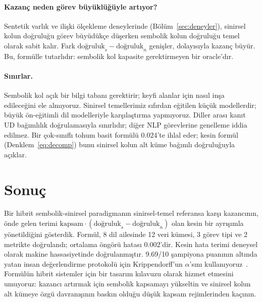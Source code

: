 \documentclass[11pt,a4paper]{article}
\begin{document}
\paragraph{Kazanç neden görev büyüklüğüyle artıyor?}
Sentetik varlık ve ilişki ölçekleme deneylerinde
(Bölüm~\ref{sec:deneyler}), sinirsel kolun doğruluğu görev büyüdükçe
düşerken sembolik kolun doğruluğu temel olarak sabit kalır. Fark
$\text{doğruluk}_s - \text{doğruluk}_n$ genişler, dolayısıyla kazanç
büyür. Bu, formülle tutarlıdır: sembolik kol kapasite gerektirmeyen
bir oracle'dır.

\paragraph{Sınırlar.}
Sembolik kol açık bir bilgi tabanı gerektirir; keyfi alanlar için nasıl
inşa edileceğini ele almıyoruz. Sinirsel temellerimiz sıfırdan
eğitilen küçük modellerdir; büyük ön-eğitimli dil modelleriyle
karşılaştırma yapmıyoruz. Diller arası kanıt UD bağımlılık
doğrulamasıyla sınırlıdır; diğer NLP görevlerine genelleme iddia
edilmez. Bir çok-sınıflı tohum basit formülü $0.024$'te ihlal eder;
kesin formül (Denklem~\ref{eq:decomp}) bunu sinirsel kolun alt küme
bağımlı doğruluğuyla açıklar.

\section{Sonuç}
\label{sec:sonuc}
Bir hibrit sembolik-sinirsel paradigmanın sinirsel-temel referansa
karşı kazancının, önde gelen terimi
$\text{kapsam} \cdot (\text{doğruluk}_s - \text{doğruluk}_n)$ olan
kesin bir ayrışımla yönetildiğini gösterdik. Formül, 8 dil ailesinde 12
veri kümesi, 3 görev tipi ve 2 metrikte doğrulandı; ortalama öngörü
hatası $0.002$'dir. Kesin hata terimi deneysel olarak makine
hassasiyetinde doğrulanmıştır. 9.69/10 şampiyona puanının altında
yatan insan değerlendirme protokolü için Krippendorff'un $\alpha$'sını
kullanıyoruz~\cite{krippendorff2011computing}. Formülün hibrit
sistemler için bir tasarım kılavuzu olarak hizmet etmesini umuyoruz:
kazancı artırmak için sembolik kapsamayı yükseltin ve sinirsel kolun
alt kümeye özgü davranışının baskın olduğu düşük kapsam
rejimlerinden kaçının.



\end{document}
